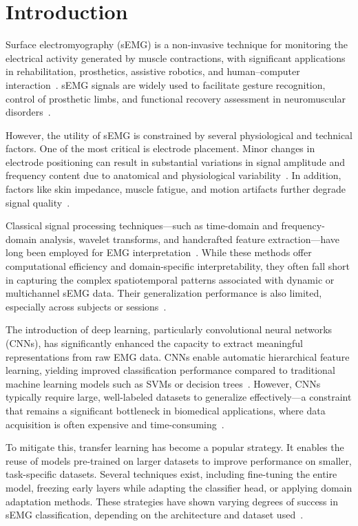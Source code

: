 %
%

\section*{Introduction}

Surface electromyography (sEMG) is a non-invasive technique for monitoring the electrical activity generated by muscle contractions, with significant applications in rehabilitation, prosthetics, assistive robotics, and human–computer interaction~\cite{Zhou2023}. sEMG signals are widely used to facilitate gesture recognition, control of prosthetic limbs, and functional recovery assessment in neuromuscular disorders~\cite{Xie2024}.

However, the utility of sEMG is constrained by several physiological and technical factors. One of the most critical is electrode placement. Minor changes in electrode positioning can result in substantial variations in signal amplitude and frequency content due to anatomical and physiological variability~\cite{Merletti2020}. In addition, factors like skin impedance, muscle fatigue, and motion artifacts further degrade signal quality~\cite{Plux2022}.

Classical signal processing techniques—such as time-domain and frequency-domain analysis, wavelet transforms, and handcrafted feature extraction—have long been employed for EMG interpretation~\cite{Chowdhury2013}. While these methods offer computational efficiency and domain-specific interpretability, they often fall short in capturing the complex spatiotemporal patterns associated with dynamic or multichannel sEMG data. Their generalization performance is also limited, especially across subjects or sessions~\cite{Phinyomark2019}.

The introduction of deep learning, particularly convolutional neural networks (CNNs), has significantly enhanced the capacity to extract meaningful representations from raw EMG data. CNNs enable automatic hierarchical feature learning, yielding improved classification performance compared to traditional machine learning models such as SVMs or decision trees~\cite{Faust2018}. However, CNNs typically require large, well-labeled datasets to generalize effectively—a constraint that remains a significant bottleneck in biomedical applications, where data acquisition is often expensive and time-consuming~\cite{Wu2022}.

To mitigate this, transfer learning has become a popular strategy. It enables the reuse of models pre-trained on larger datasets to improve performance on smaller, task-specific datasets. Several techniques exist, including fine-tuning the entire model, freezing early layers while adapting the classifier head, or applying domain adaptation methods. These strategies have shown varying degrees of success in sEMG classification, depending on the architecture and dataset used~\cite{Cote2019, Ameri2020}.

